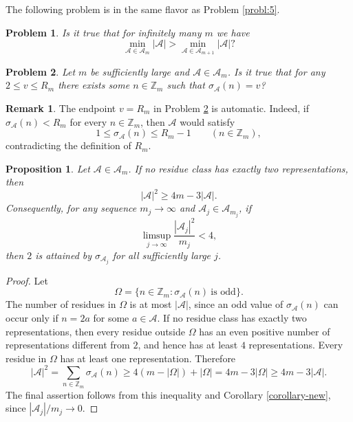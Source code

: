 \documentclass[12pt,a4paper,reqno]{amsart}
\numberwithin{equation}{section}
\theoremstyle{plain}
\newtheorem{problem}{Problem}
\newtheorem{proposition}{Proposition}
\theoremstyle{definition}
\newtheorem{remark}{Remark}
\begin{document}
The following problem is in the same flavor as Problem \ref{probl:5}.

\begin{problem}\label{probl:6}
     Is it true that for infinitely many $m$ we have
    $$
    \min_{\mathcal{A}\in \mathscr{A}_m}|\mathcal{A}|> \min_{\mathcal{A}\in \mathscr{A}_{m+1}}|\mathcal{A}|?
    $$ 
\end{problem}

 \begin{problem}\label{probl:7}
    Let $m$ be sufficiently large and $\mathcal{A}\in \mathscr{A}_m$. Is it true that for any $2\le v\le R_m$ there exists some $n\in \mathbb{Z}_m$ such that $\sigma_{\mathcal{A}}(n)=v$?
\end{problem}

\begin{remark}
The endpoint $v=R_m$ in Problem \ref{probl:7} is automatic. Indeed, if $\sigma_{\mathcal A}(n)<R_m$ for every $n\in\mathbb Z_m$, then $\mathcal A$ would satisfy
\[
1\le \sigma_{\mathcal A}(n)\le R_m-1\qquad(n\in\mathbb Z_m),
\]
contradicting the definition of $R_m$.
\end{remark}

\begin{proposition}\label{pro-value-2}
Let $\mathcal A\in\mathscr A_m$. If no residue class has exactly two representations, then
\[
|\mathcal A|^2\ge 4m-3|\mathcal A|.
\]
Consequently, for any sequence $m_j\to\infty$ and $\mathcal A_j\in\mathscr A_{m_j}$, if
\[
\limsup_{j\to\infty}\frac{|\mathcal A_j|^2}{m_j}<4,
\]
then $2$ is attained by $\sigma_{\mathcal A_j}$ for all sufficiently large $j$.
\end{proposition}

\begin{proof}
Let
\[
\Omega=\{n\in\mathbb Z_m:\sigma_{\mathcal A}(n)\ \text{is odd}\}.
\]
The number of residues in $\Omega$ is at most $|\mathcal A|$, since an odd value of $\sigma_{\mathcal A}(n)$ can occur only if $n=2a$ for some $a\in\mathcal A$. If no residue class has exactly two representations, then every residue outside $\Omega$ has an even positive number of representations different from $2$, and hence has at least $4$ representations. Every residue in $\Omega$ has at least one representation. Therefore
\[
|\mathcal A|^2=\sum_{n\in\mathbb Z_m}\sigma_{\mathcal A}(n)
\ge 4(m-|\Omega|)+|\Omega|=4m-3|\Omega|
\ge 4m-3|\mathcal A|.
\]
The final assertion follows from this inequality and Corollary \ref{corollary-new}, since $|\mathcal A_j|/m_j\to0$.
\end{proof}
\end{document}
